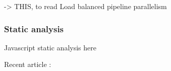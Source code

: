 -> THIS, to read
Load balanced pipeline parallelism \cite{Kamruzzaman2013}


\subsubsection{Static analysis}

Javascript static analysis here

Recent article : \cite{Chudnov2015}

\endinput

There are attempts at conciliating the two approaches.

Without a transformation process :
Erlang - Jay Nelson, Structured Programming Using Processes









Continuations and coroutines \cite{Haynes1984}
-> THIS

Parallel closures, a new twist on an old idea \cite{Matsakis2012a}

Continuation of work on SEDA \cite{Salmito2014}